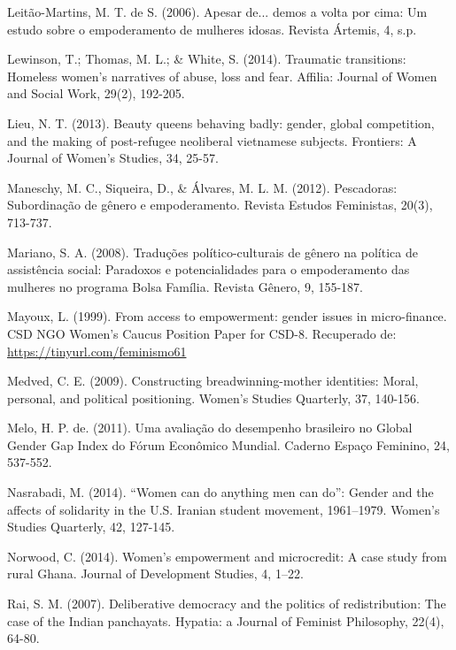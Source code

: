 \hangindent=25pt
\noindent Leitão-Martins, M. T. de S. (2006). Apesar de... demos a volta por cima: Um estudo sobre o empoderamento de mulheres idosas. Revista Ártemis, 4, s.p.

\hangindent=25pt
\noindent Lewinson, T.; Thomas, M. L.; \& White, S. (2014). Traumatic transitions: Homeless women’s narratives of abuse, loss and fear. Affilia: Journal of Women and Social Work, 29(2), 192-205.

\hangindent=25pt
\noindent Lieu, N. T. (2013). Beauty queens behaving badly: gender, global competition, and the making of post-refugee neoliberal vietnamese subjects. Frontiers: A Journal of Women’s Studies, 34, 25-57.

\hangindent=25pt
\noindent Maneschy, M. C., Siqueira, D., \& Álvares, M. L. M. (2012). Pescadoras: Subordinação de gênero e empoderamento. Revista Estudos Feministas, 20(3), 713-737.

\hangindent=25pt
\noindent Mariano, S. A. (2008). Traduções político-culturais de gênero na política de assistência social: Paradoxos e potencialidades para o empoderamento das mulheres no programa Bolsa Família. Revista Gênero, 9, 155-187.

\hangindent=25pt
\noindent Mayoux, L. (1999). From access to empowerment: gender issues in micro-finance. CSD NGO Women’s Caucus Position Paper for CSD-8. Recuperado de: \url{https://tinyurl.com/feminismo61}

\hangindent=25pt
\noindent Medved, C. E. (2009). Constructing breadwinning-mother identities: Moral, personal, and political positioning. Women’s Studies Quarterly, 37, 140-156.

\hangindent=25pt
\noindent Melo, H. P. de. (2011). Uma avaliação do desempenho brasileiro no Global Gender Gap Index do Fórum Econômico Mundial. Caderno Espaço Feminino, 24, 537-552.

\hangindent=25pt
\noindent Nasrabadi, M. (2014). “Women can do anything men can do”: Gender and the affects of solidarity in the U.S. Iranian student movement, 1961–1979. Women’s Studies Quarterly, 42, 127-145.

\hangindent=25pt
\noindent Norwood, C. (2014). Women's empowerment and microcredit: A case study from rural Ghana. Journal of Development Studies, 4, 1–22.

\hangindent=25pt
\noindent Rai, S. M. (2007). Deliberative democracy and the politics of redistribution: The case of the Indian panchayats. Hypatia: a Journal of Feminist Philosophy, 22(4), 64-80.

